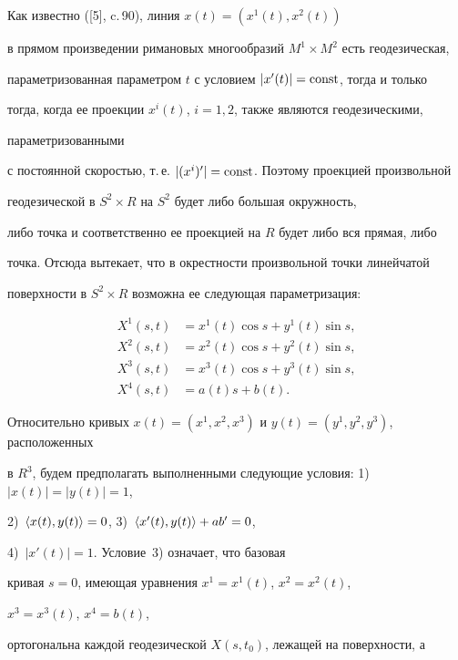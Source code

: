\begin{pf}


Как известно ([5], c.\,90), линия $x(t)=(x^1(t),x^2(t)) $


в прямом произведении римановых многообразий $M^1 \times M^2$ есть геодезическая,


параметризованная параметром $t$ с условием $|x'(t)|=\operatorname{const}$, тогда и только 


тогда, когда ее проекции $x^i(t)$, $i=1,2$, также являются геодезическими, 


параметризованными 


с постоянной  скоростью, т.\,е. $|(x^i)'|=\operatorname{const}$. Поэтому проекцией произвольной 


геодезической в $S^2 \times R$ на $S^2$ будет либо большая окружность, 


либо точка  и соответственно ее проекцией на $R$  будет либо вся прямая, либо 


точка. Отсюда вытекает, что в окрестности произвольной точки линейчатой 


поверхности в $S^2 \times R$ возможна ее следующая параметризация:


\begin{align*}


X^1(s,t)&= x^1(t) \cos s +y^1(t) \sin s,\\


X^2(s,t)&= x^2(t) \cos s +y^2(t) \sin s,\\


X^3(s,t)&= x^3(t) \cos s +y^3(t) \sin s,\\


X^4(s,t)&=a(t)s+ b(t).


\end{align*}





Относительно кривых $x(t)=(x^1,x^2,x^3)$ и $y(t)=(y^1,y^2,y^3)$, расположенных 


в $R^3$, будем предполагать выполненными следующие условия: 1)~$|x(t)|=|y(t)|=1$,


2)~$\langle x(t),y(t)\rangle =0$, 3)~$\langle x'(t),y(t)\rangle+ab'=0$,


4)~$|x'(t)|=1$. Условие~3) означает, что базовая 


кривая $s=0$, имеющая уравнения $x^1=x^1(t)$, $x^2=x^2(t)$,


$x^3=x^3(t)$, $x^4=b(t)$,


ортогональна каждой геодезической $X(s,t_0)$, лежащей на поверхности, а 



\end{pf}
